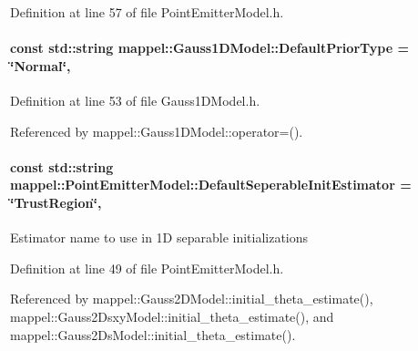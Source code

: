 Definition at line 57 of file Point\+Emitter\+Model.\+h.

\paragraph[{\texorpdfstring{Default\+Prior\+Type}{DefaultPriorType}}]{\setlength{\rightskip}{0pt plus 5cm}const std\+::string mappel\+::\+Gauss1\+D\+Model\+::\+Default\+Prior\+Type = \char`\"{}Normal\char`\"{}\hspace{0.3cm}{\ttfamily [static]}, {\ttfamily [inherited]}}\hypertarget{classmappel_1_1Gauss1DModel_a4186ce131a5cc9a451ecc0011e4e6682}{}\label{classmappel_1_1Gauss1DModel_a4186ce131a5cc9a451ecc0011e4e6682}


Definition at line 53 of file Gauss1\+D\+Model.\+h.



Referenced by mappel\+::\+Gauss1\+D\+Model\+::operator=().

\paragraph[{\texorpdfstring{Default\+Seperable\+Init\+Estimator}{DefaultSeperableInitEstimator}}]{\setlength{\rightskip}{0pt plus 5cm}const std\+::string mappel\+::\+Point\+Emitter\+Model\+::\+Default\+Seperable\+Init\+Estimator = \char`\"{}Trust\+Region\char`\"{}\hspace{0.3cm}{\ttfamily [static]}, {\ttfamily [inherited]}}\hypertarget{classmappel_1_1PointEmitterModel_ad8c3dc629d75d22f25855a5f1ba8729f}{}\label{classmappel_1_1PointEmitterModel_ad8c3dc629d75d22f25855a5f1ba8729f}
Estimator name to use in 1D separable initializations 

Definition at line 49 of file Point\+Emitter\+Model.\+h.



Referenced by mappel\+::\+Gauss2\+D\+Model\+::initial\+\_\+theta\+\_\+estimate(), mappel\+::\+Gauss2\+Dsxy\+Model\+::initial\+\_\+theta\+\_\+estimate(), and mappel\+::\+Gauss2\+Ds\+Model\+::initial\+\_\+theta\+\_\+estimate().

